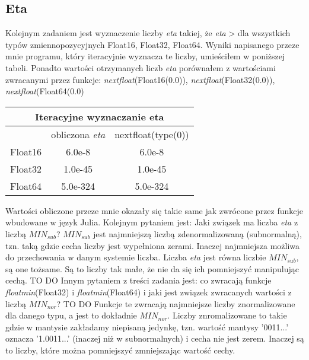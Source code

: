 \documentclass[]{article}
\begin{document}
	
	\subsection*{Eta}
	Kolejnym zadaniem jest wyznaczenie liczby \textit{eta} takiej, że \textit{eta} \textgreater{} dla wszystkich typów zmiennopozycyjnych Float16, Float32, Float64.
	Wyniki napisanego przeze mnie programu, który iteracyjnie wyznacza te liczby, umieściłem w poniższej tabeli. Ponadto wartości otrzymanych liczb \textit{eta} porównałem z wartościami zwracanymi przez funkcje: \mbox{\textit{nextfloat}(Float16(0.0))}, \mbox{\textit{nextfloat}(Float32(0.0))}, \mbox{\textit{nextfloat}(Float64(0.0)}
	
	\begin{table}[h!]
		\centering
		\label{tab:table1}
		\begin{tabular}{|c|c|c|}
			\multicolumn{3}{c}{Iteracyjne wyznaczanie eta}\\
			\hline
			& obliczona \textit{eta} & nextfloat(type(0))  \\
			\hline
			Float16 & 6.0e-8 & 6.0e-8 \\
			\hline
			Float32 & 1.0e-45 & 1.0e-45 \\
			\hline
			Float64 & 5.0e-324 & 5.0e-324 \\
			\hline
		\end{tabular}
	\end{table}

	Wartości obliczone przeze mnie okazały się takie same jak zwrócone przez funkcje wbudowane w język Julia.
	Kolejnym pytaniem jest: Jaki związek ma liczba \textit{eta} z liczbą $MIN_{sub}$?\newline
	$MIN_{sub}$ jest najmniejszą liczbą zdenormalizowaną (subnormalną), tzn. taką gdzie cecha liczby jest wypełniona zerami. Inaczej najmniejsza możliwa do przechowania w danym systemie liczba. Liczba \textit{eta} jest równa liczbie $MIN_{sub}$, są one tożsame. Są to liczby tak małe, że nie da się ich pomniejszyć manipulując cechą.
	\colorbox{BurntOrange}{TO DO}\newline
	Innym pytaniem z treści zadania jest: co zwracają funkcje \textit{floatmin}(Float32) i \textit{floatmin}(Float64) i jaki jest związek zwracanych wartości z liczbą $MIN_{nor}$?\newline
		\colorbox{BurntOrange}{TO DO}
	Funkcje te zwracają najmniejsze liczby znormalizowane dla danego typu, a jest to dokładnie $MIN_{nor}$. Liczby znromalizowane to takie gdzie w mantysie zakładamy niepisaną jedynkę, tzn. wartość mantysy '0011...' oznacza '1.0011...' (inaczej niż w subnormalnych) i cecha nie jest zerem. Inaczej są to liczby, które można pomniejszyć zmniejszając wartość cechy.
\end{document}
